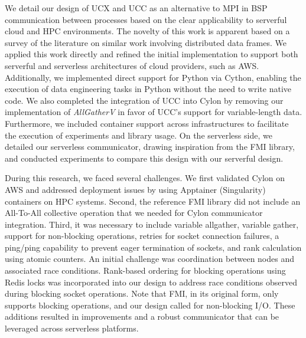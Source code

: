 \documentclass[conference]{IEEEtran}
\begin{document}
We detail our design of UCX and UCC as an alternative to MPI in BSP communication between processes based on the clear applicability to serverful cloud and HPC environments. The novelty of this work is apparent based on a survey of the literature on similar work involving distributed data frames. We applied this work directly and refined the initial implementation to support both serverful and serverless architectures of cloud providers, such as AWS. Additionally, we implemented direct support for Python via Cython, enabling the execution of data engineering tasks in Python without the need to write native code. We also completed the integration of UCC into Cylon by removing our implementation of \textit{AllGatherV} in favor of UCC's support for variable-length data. Furthermore, we included container support across infrastructures to facilitate the execution of experiments and library usage.  On the serverless side, we detailed our serverless communicator, drawing inspiration from the FMI library, and conducted experiments to compare this design with our serverful design.


During this research, we faced several challenges. We first validated Cylon on AWS and addressed deployment issues by using Apptainer (Singularity) containers on HPC systems. Second, the reference FMI library did not include an All-To-All collective operation that we needed for Cylon communicator integration. Third, it was necessary to include variable allgather, variable gather, support for non-blocking operations, retries for socket connection failures, a ping/ping capability to prevent eager termination of sockets, and rank calculation using atomic counters.  An initial challenge was coordination between nodes and associated race conditions.  Rank-based ordering for blocking operations using Redis locks was incorporated into our design to address race conditions observed during blocking socket operations.  Note that FMI, in its original form, only supports blocking operations, and our design called for non-blocking I/O.  These additions resulted in improvements and a robust communicator that can be leveraged across serverless platforms.
\end{document}

